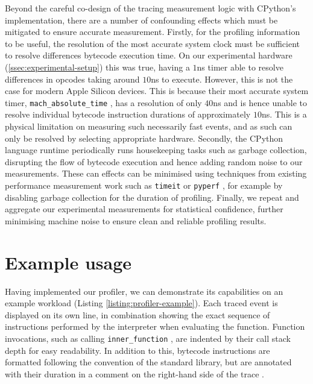 Beyond the careful co-design of the tracing measurement logic with CPython's implementation, there are a number of confounding effects which must be mitigated to ensure accurate measurement.
Firstly, for the profiling information to be useful, the resolution of the most accurate system clock must be sufficient to resolve differences bytecode execution time. On our experimental hardware (\autoref{ssec:experimental-setup}) this was true, having a $1$ns timer able to resolve differences in opcodes taking around $10$ns to execute. However, this is not the case for modern Apple Silicon devices. This is because their most accurate system timer, \texttt{mach\_absolute\_time} \cite{appleinc.Mach_absolute_time}, has a resolution of only $40$ns and is hence unable to resolve individual bytecode instruction durations of approximately $10$ns. This is a physical limitation on measuring such necessarily fast events, and as such can only be resolved by selecting appropriate hardware.
Secondly, the CPython language runtime periodically runs housekeeping tasks such as garbage collection, disrupting the flow of bytecode execution and hence adding random noise to our measurements. These can effects can be minimised using techniques from existing performance measurement work such as \texttt{timeit} \cite{pythonsoftwarefoundationTimeitMeasureExecution} or \texttt{pyperf} \cite{victorstinnerPsfPyperf2025}, for example by disabling garbage collection for the duration of profiling.
Finally, we repeat and aggregate our experimental measurements for statistical confidence, further minimising machine noise to ensure clean and reliable profiling results.


\section{Example usage}
\label{sec:profiling-bytecode-examples}

Having implemented our profiler, we can demonstrate its capabilities on an example workload (Listing \ref{listing:profiler-example}).
Each traced event is displayed on its own line, in combination showing the exact sequence of instructions performed by the interpreter when evaluating the function. Function invocations, such as calling \texttt{inner\_function} , are indented by their call stack depth for easy readability. In addition to this, bytecode instructions are formatted following the convention of the standard library, but are annotated with their duration in a comment on the right-hand side of the trace .


